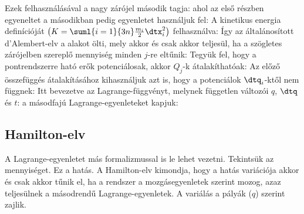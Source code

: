    Ezek felhasználásával a nagy zárójel második tagja:
   ahol az első részben  egyeneltet a másodikban pedig  egyenletet használjuk fel:
   A kinetikus energia definícióját $\left(K=\suml{i=1}{3n}\frac{m_i}{2}\dtx_i^2\right)$ felhasználva:
   Így az általánosított d'Alembert-elv a
   alakot ölti, mely akkor és csak akkor teljesül, ha a szögletes zárójelben szereplő mennyiség minden $j$-re eltűnik:
   Tegyük fel, hogy a pontrendszerre ható erők potenciálosak, akkor $Q_j$-k átalakíthatóak:
   Az előző összefüggés átalakításához kihasználjuk azt is, hogy a potenciálok $\dtq_i$-ktől nem függnek:
   Itt bevezetve az Lagrange-függvényt, melynek független változói $q$, $\dtq$ és $t$:
   a másodfajú Lagrange-egyenleteket kapjuk:
   
  \subsection{Hamilton-elv}\label{ss1:hamiltonelv}
   
   A Lagrange-egyenletet más formalizmussal is le lehet vezetni.
   Tekintsük az 
   mennyiséget.
   Ez a hatás.
   A Hamilton-elv kimondja, hogy a hatás variációja akkor és csak akkor tűnik el, ha a rendszer a mozgásegyenletek szerint mozog, azaz teljesülnek a másodrendű Lagrange-egyenletek.
   A variálás a pályák ($q$) szerint zajlik.
   
